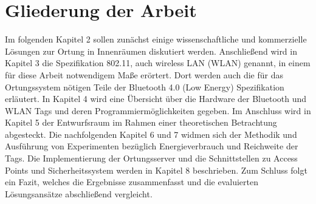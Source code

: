 \section{Gliederung der Arbeit}
\label{ch:Einleitung:sec:Gliederung}
Im folgenden Kapitel 2 sollen zunächst einige wissenschaftliche und kommerzielle Lösungen zur Ortung in Innenräumen diskutiert werden. 
Anschließend wird in Kapitel 3 die Spezifikation 802.11, auch wireless LAN (WLAN) genannt, in einem für diese Arbeit notwendigem Maße erörtert. Dort werden auch die für das Ortungssystem nötigen Teile der Bluetooth 4.0 (Low Energy) Spezifikation erläutert. 
In Kapitel 4 wird eine Übersicht über die Hardware der Bluetooth und WLAN Tags und deren Programmiermöglichkeiten gegeben. 
Im Anschluss wird in Kapitel 5 der Entwurfsraum im Rahmen einer theoretischen Betrachtung abgesteckt. 
Die nachfolgenden Kapitel 6 und 7 widmen sich der Methodik und Ausführung von Experimenten bezüglich Energieverbrauch und Reichweite der Tags.
Die Implementierung der Ortungsserver und die Schnittstellen zu Access Points und Sicherheitssystem werden in Kapitel 8 beschrieben.
Zum Schluss folgt ein Fazit, welches die Ergebnisse zusammenfasst und die evaluierten Lösungsansätze abschließend vergleicht.

